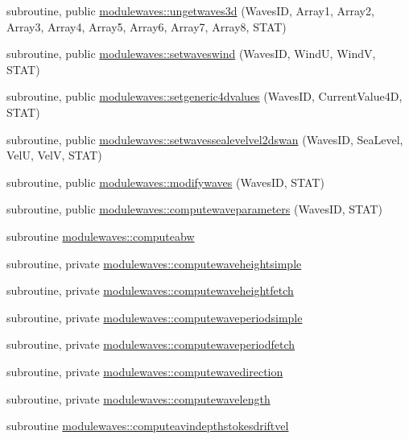 \begin{DoxyCompactItemize}
\item 
subroutine, public \mbox{\hyperlink{namespacemodulewaves_a889d8243c00922f75bfc878e13f4990d}{modulewaves\+::ungetwaves3d}} (Waves\+ID, Array1, Array2, Array3, Array4, Array5, Array6, Array7, Array8, S\+T\+AT)
\item 
subroutine, public \mbox{\hyperlink{namespacemodulewaves_a58822c6f40408298926b3e3778be3adc}{modulewaves\+::setwaveswind}} (Waves\+ID, WindU, WindV, S\+T\+AT)
\item 
subroutine, public \mbox{\hyperlink{namespacemodulewaves_a27286ddaee0e46cf76c86b80a35ee9ad}{modulewaves\+::setgeneric4dvalues}} (Waves\+ID, Current\+Value4D, S\+T\+AT)
\item 
subroutine, public \mbox{\hyperlink{namespacemodulewaves_aa5ff8156c82807bd7134751bf6b90824}{modulewaves\+::setwavessealevelvel2dswan}} (Waves\+ID, Sea\+Level, VelU, VelV, S\+T\+AT)
\item 
subroutine, public \mbox{\hyperlink{namespacemodulewaves_ad08ecc5e93cabd5c4b166e1af608e044}{modulewaves\+::modifywaves}} (Waves\+ID, S\+T\+AT)
\item 
subroutine, public \mbox{\hyperlink{namespacemodulewaves_a6a63e2ee3bdd7ee4378a33408a4668a7}{modulewaves\+::computewaveparameters}} (Waves\+ID, S\+T\+AT)
\item 
subroutine \mbox{\hyperlink{namespacemodulewaves_a3aa2de7449377be15fcc0bbb463170ed}{modulewaves\+::computeabw}}
\item 
subroutine, private \mbox{\hyperlink{namespacemodulewaves_af86c07d276fd3f5fe89a2adc94d0518f}{modulewaves\+::computewaveheightsimple}}
\item 
subroutine, private \mbox{\hyperlink{namespacemodulewaves_a13f51790900a5a9f5a5b30632d881229}{modulewaves\+::computewaveheightfetch}}
\item 
subroutine, private \mbox{\hyperlink{namespacemodulewaves_a8fac90eb88cf4a39a40d63dbc040c2fa}{modulewaves\+::computewaveperiodsimple}}
\item 
subroutine, private \mbox{\hyperlink{namespacemodulewaves_abd3acb5aa4305dcf02b29e94c10a666f}{modulewaves\+::computewaveperiodfetch}}
\item 
subroutine, private \mbox{\hyperlink{namespacemodulewaves_ad48d7252dffb5d91c6b1bd578279b9f6}{modulewaves\+::computewavedirection}}
\item 
subroutine, private \mbox{\hyperlink{namespacemodulewaves_acea107970c1ba41962a9affab7ff313a}{modulewaves\+::computewavelength}}
\item 
subroutine \mbox{\hyperlink{namespacemodulewaves_ad23198cd88a84595114e626504892d21}{modulewaves\+::computeavindepthstokesdriftvel}}

\end{DoxyCompactItemize}
